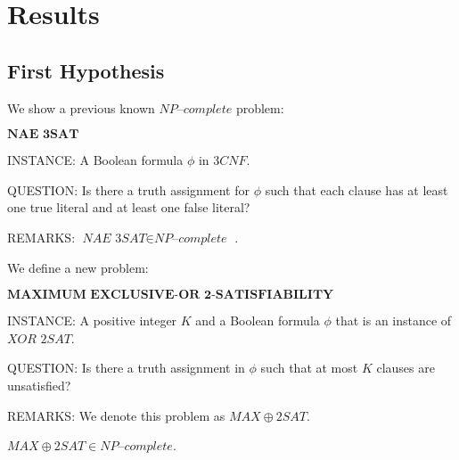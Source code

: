 \documentclass[a4paper,UKenglish,cleveref, autoref]{lipics-v2019}
\begin{document}
\section{Results}

\subsection{First Hypothesis}

We show a previous known $\textit{NP--complete}$ problem:

\begin{definition}
$\textbf{NAE 3SAT}$

INSTANCE: A Boolean formula $\phi$ in $3CNF$.

QUESTION: Is there a truth assignment for $\phi$ such that each clause has at least one true literal and at least one false literal?

REMARKS: $\textit{NAE 3SAT} \in \textit{NP--complete}$ \cite{GJ79}.
\end{definition}

We define a new problem:

\begin{definition}
$\textbf{MAXIMUM EXCLUSIVE-OR 2-SATISFIABILITY}$

INSTANCE: A positive integer $K$ and a Boolean formula $\phi$ that is an instance of $\textit{XOR 2SAT}$.

QUESTION: Is there a truth assignment in $\phi$ such that at most $K$ clauses are unsatisfied?

REMARKS: We denote this problem as $MAX\oplus2SAT$.
\end{definition}


\begin{theorem}
\label{completeness}
$MAX\oplus2SAT \in \textit{NP--complete}$.
\end{theorem}
\end{document}
